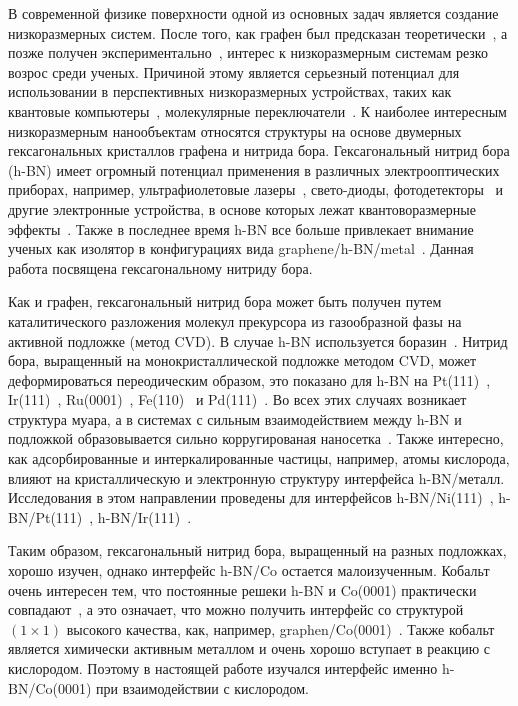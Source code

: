 
{\actuality} 
В современной физике поверхности одной из основных задач является
создание низкоразмерных систем. После того, как графен был предсказан
теоретически~\cite{Wallace1947,McClure1956,Slonczewski1958}, а позже получен экспериментально~\cite{Novoselov2004}, интерес к 
низкоразмерным системам резко возрос среди ученых. Причиной этому является
серьезный потенциал для использовании в перспективных низкоразмерных 
устройствах, таких как квантовые компьютеры~\cite{Barends2014}, молекулярные переключатели~\cite{G.Joachim2000,Nitzan2003}. 
К наиболее интересным низкоразмерным нанообъектам относятся структуры на 
основе двумерных гексагональных кристаллов графена и нитрида бора.
Гексагональный нитрид бора (h-BN) имеет огромный потенциал применения в различных
электрооптических приборах, например, ультрафиолетовые лазеры~\cite{Kubota2007}, 
свето-диоды, фотодетекторы~\cite{Zheng2008} и другие электронные
устройства, в основе которых лежат квантоворазмерные эффекты~\cite{
Chau2007}. Также в последнее время h-BN все больше привлекает внимание
ученых как изолятор в конфигурациях вида graphene/h-BN/metal~\cite{
Kamalakar2014,Kamalakar2016,Usachev_doc}.
Данная работа посвящена гексагональному нитриду бора. 


Как и графен, гексагональный нитрид бора может быть получен путем каталитического разложения молекул прекурсора из газообразной 
фазы на активной подложке (метод CVD). В случае h-BN используется
боразин~\cite{Kidambi2014,Paffett1990}. Нитрид бора, выращенный на
монокристаллической подложке методом CVD, может деформироваться
переодическим образом, это показано для h-BN на Pt(111)~\cite{Cavar2008},
Ir(111)~\cite{FarwickzumHagen2016,Usachov2012, Orlando2012},
Ru(0001)~\cite{Brugger2009}, Fe(110)~\cite{Vinogradov2012} и Pd(111)~\cite{Nagashima1995}. Во всех этих случаях возникает структура муара, а в системах
с сильным взаимодействием между h-BN и подложкой образовывается сильно 
корругированая наносетка~\cite{Preobrajenski2008_Adsorption-inducedgapstatesofh-BNonmetalsurfaces}. 
Также интересно, как адсорбированные и интеркалированные частицы, например,
атомы кислорода, влияют на кристаллическую и электронную структуру 
интерфейса h-BN/металл. Исследования в этом направлении проведены для 
интерфейсов h-BN/Ni(111)~\cite{Wasey2013}, h-BN/Pt(111)~\cite{Meng2018},
h-BN/Ir(111)~\cite{Simonov2012_h-BN/Ir_Oxydation}.


Таким образом, гексагональный нитрид бора, выращенный на разных 
подложках, хорошо изучен, однако интерфейс h-BN/Co остается малоизученным.
Кобальт очень интересен тем, что постоянные решеки h-BN и Co(0001) практически
совпадают~\cite{Usachov2018_h-BN/_PED_STM}, а это означает, что можно получить
интерфейс со структурой $(1\times1)$ высокого качества, как, например, graphen/Co(0001)~\cite{Usachov2016}. Также кобальт является химически активным металлом
и очень хорошо вступает в реакцию с кислородом. Поэтому в настоящей работе 
изучался интерфейс именно h-BN/Co(0001) при взаимодействии с кислородом.


